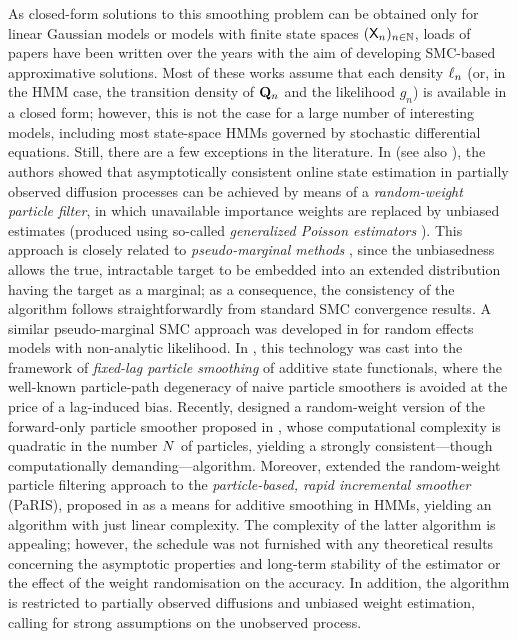 As closed-form solutions to this smoothing problem can be obtained only for linear Gaussian models or models with finite state spaces $(\mathsf{X}_n)_{n \in \mathbb{N}}$, loads of papers have been written over the years with the aim of developing SMC-based approximative solutions. Most of these works assume that each density $\ell_{n}$ (or, in the HMM case, the transition density of $\mathbf{Q}_n$ and the likelihood $g_n$) is available in a closed form; however, this is not the case for a large number of interesting models, including most state-space HMMs governed by stochastic differential equations. Still, there are a few exceptions in the literature. In \cite{fearnhead2008particle} (see also \cite{fearnhead:papaspiliopoulos:roberts:stuart:2010}), the authors showed that asymptotically consistent online state estimation in partially observed diffusion processes can be achieved by means of a \emph{random-weight particle filter}, in which unavailable importance weights are replaced by unbiased estimates (produced using so-called \emph{generalized Poisson estimators} \cite{beskos:papaspiliopoulos:roberts:fearnhead:2006}). This approach is closely related to \emph{pseudo-marginal methods} \cite{andrieu:robert:2009}, since the unbiasedness allows the true, intractable target to be embedded into an extended distribution having the target as a marginal; as a consequence, the consistency of the algorithm follows straightforwardly from standard SMC convergence results. A similar pseudo-marginal SMC approach was developed in \cite{mcgree:drovandi:white:pettitt:2016} for random effects models with non-analytic likelihood. In \cite{olsson:strojby:2011}, this technology was cast into the framework of \emph{fixed-lag particle smoothing} of additive state functionals, where the well-known particle-path degeneracy of naive particle smoothers is avoided at the price of a lag-induced bias. Recently, \cite{yonekura:beskos:2020} designed a random-weight version of the forward-only particle smoother proposed in \cite{delmoral:doucet:singh:2010}, whose computational complexity is quadratic in the number $N$ of particles, yielding a strongly consistent---though computationally demanding---algorithm. Moreover, \cite{gloaguen2018online} extended the random-weight particle filtering approach to the \emph{particle-based, rapid incremental smoother} (PaRIS), proposed in \cite{olsson:westerborn:2014b} as a means for additive smoothing in HMMs, yielding an algorithm with just linear complexity. The complexity of the latter algorithm is appealing; however, the schedule was not furnished with any theoretical results concerning the asymptotic properties and long-term stability of the estimator or the effect of the weight randomisation on the accuracy. In addition, the algorithm is restricted to partially observed diffusions and unbiased weight estimation, calling for strong assumptions on the unobserved process. 
        
